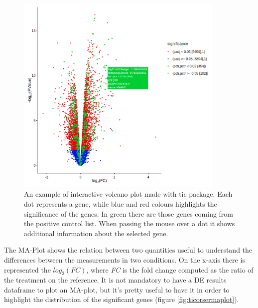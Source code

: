 \begin{figure}[H]
\centering
\includegraphics[width=10cm, keepaspectratio]{img/ticorser/volcano_example.png}
\caption[ticorser volcano]{An example of interactive volcano plot made with \gls{tic} package. Each dot represents a gene, while blue and red colours highlights the significance of the genes. In green there are those genes coming from the positive control list. When passing the mouse over a dot it shows additional information about the selected gene.}
\label{fig:ticorservolcano}
\end{figure}

The MA-Plot shows the relation between two quantities useful to understand the differences between the measurements in two conditions.
On the x-axis there is represented the $log_2(FC)$, where \textit{FC} is the fold change computed as the ratio of the treatment on the reference.
It is not mandatory to have a DE results dataframe to plot an MA-plot, but it's pretty useful to have it in order to highlight the distribution of the significant genes (figure \ref{fig:ticorsermaplot}).
 
